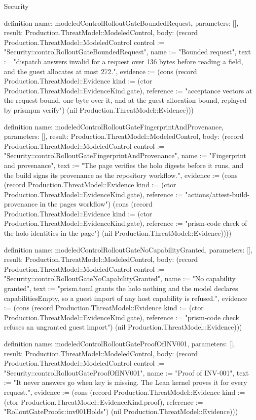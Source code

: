 \begin{lexlean}{Security}
\begin{semanticmodule}
definition{
  name: modeledControlRolloutGateBoundedRequest,
  parameters: [],
  result: Production.ThreatModel::ModeledControl,
  body: (record Production.ThreatModel::ModeledControl {control := "Security::controlRolloutGateBoundedRequest", name := "Bounded request", text := "dispatch answers invalid for a request over 136 bytes before reading a field, and the guest allocates at most 272.", evidence := (cons (record Production.ThreatModel::Evidence {kind := (ctor Production.ThreatModel::EvidenceKind.gate), reference := "acceptance vectors at the request bound, one byte over it, and at the guest allocation bound, replayed by prismpm verify"}) (nil Production.ThreatModel::Evidence))})
}

definition{
  name: modeledControlRolloutGateFingerprintAndProvenance,
  parameters: [],
  result: Production.ThreatModel::ModeledControl,
  body: (record Production.ThreatModel::ModeledControl {control := "Security::controlRolloutGateFingerprintAndProvenance", name := "Fingerprint and provenance", text := "The page verifies the holo digests before it runs, and the build signs its provenance as the repository workflow.", evidence := (cons (record Production.ThreatModel::Evidence {kind := (ctor Production.ThreatModel::EvidenceKind.gate), reference := "actions/attest-build-provenance in the pages workflow"}) (cons (record Production.ThreatModel::Evidence {kind := (ctor Production.ThreatModel::EvidenceKind.gate), reference := "prism-code check of the holo identities in the page"}) (nil Production.ThreatModel::Evidence)))})
}

definition{
  name: modeledControlRolloutGateNoCapabilityGranted,
  parameters: [],
  result: Production.ThreatModel::ModeledControl,
  body: (record Production.ThreatModel::ModeledControl {control := "Security::controlRolloutGateNoCapabilityGranted", name := "No capability granted", text := "prism.toml grants the holo nothing and the model declares capabilitiesEmpty, so a guest import of any host capability is refused.", evidence := (cons (record Production.ThreatModel::Evidence {kind := (ctor Production.ThreatModel::EvidenceKind.gate), reference := "prism-code check refuses an ungranted guest import"}) (nil Production.ThreatModel::Evidence))})
}

definition{
  name: modeledControlRolloutGateProofOfINV001,
  parameters: [],
  result: Production.ThreatModel::ModeledControl,
  body: (record Production.ThreatModel::ModeledControl {control := "Security::controlRolloutGateProofOfINV001", name := "Proof of INV-001", text := "It never answers go when key is missing. The Lean kernel proves it for every request.", evidence := (cons (record Production.ThreatModel::Evidence {kind := (ctor Production.ThreatModel::EvidenceKind.proof), reference := "RolloutGateProofs::inv001Holds"}) (nil Production.ThreatModel::Evidence))})
}


\end{semanticmodule}
\end{lexlean}
